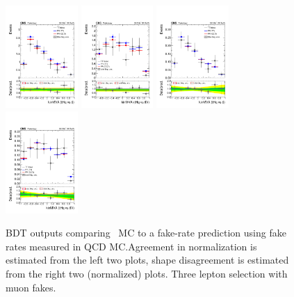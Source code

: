 \begin{figure}[htb]
 \centering
 \includegraphics[width=0.245\textwidth]{figures/FR_closures/thqMVA_tt_3l_mufake_norm.pdf} 
 \includegraphics[width=0.245\textwidth]{figures/FR_closures/thqMVA_ttv_3l_mufake_norm.pdf} 
 \includegraphics[width=0.245\textwidth]{figures/FR_closures/thqMVA_tt_3l_mufake_shape.pdf} 
 \includegraphics[width=0.245\textwidth]{figures/FR_closures/thqMVA_ttv_3l_mufake_shape.pdf} 
\caption{BDT outputs comparing \ttbar\ MC to a fake-rate prediction using fake rates measured in QCD MC.\@ Agreement in normalization is estimated from the left two plots, shape disagreement is estimated from the right two (normalized) plots. Three lepton selection with muon fakes.} 
\label{fig:frclosure_3l_mufake}
\end{figure}
